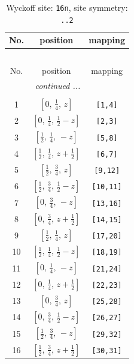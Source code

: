 \documentclass[fleqn,8pt]{jsarticle}
\begin{document}
\renewcommand{\arraystretch}{1.2}
\begin{longtable}{ccc}
\caption{Wyckoff site: {\tt 16n}, site symmetry: {\tt ..2}}
 \\
 \hline \hline
No. & position & mapping \\ \hline \endfirsthead

\multicolumn{2}{l}{\tablename\ \thetable{}} \\
 \hline \hline
No. & position & mapping \\ \hline \endhead

 \hline \hline
\multicolumn{2}{r}{\footnotesize\it continued ...} \\ \endfoot

 \hline \hline
\multicolumn{2}{r}{} \\ \endlastfoot

1 & $\left[ 0,\, \frac{1}{4},\, z \right]$ & {\tt [1,4]} \\ \hline
2 & $\left[ 0,\, \frac{1}{4},\, \frac{1}{2} - z \right]$ & {\tt [2,3]} \\ \hline
3 & $\left[ \frac{1}{2},\, \frac{1}{4},\, - z \right]$ & {\tt [5,8]} \\ \hline
4 & $\left[ \frac{1}{2},\, \frac{1}{4},\, z + \frac{1}{2} \right]$ & {\tt [6,7]} \\ \hline
5 & $\left[ \frac{1}{2},\, \frac{3}{4},\, z \right]$ & {\tt [9,12]} \\ \hline
6 & $\left[ \frac{1}{2},\, \frac{3}{4},\, \frac{1}{2} - z \right]$ & {\tt [10,11]} \\ \hline
7 & $\left[ 0,\, \frac{3}{4},\, - z \right]$ & {\tt [13,16]} \\ \hline
8 & $\left[ 0,\, \frac{3}{4},\, z + \frac{1}{2} \right]$ & {\tt [14,15]} \\ \hline
9 & $\left[ \frac{1}{2},\, \frac{1}{4},\, z \right]$ & {\tt [17,20]} \\ \hline
10 & $\left[ \frac{1}{2},\, \frac{1}{4},\, \frac{1}{2} - z \right]$ & {\tt [18,19]} \\ \hline
11 & $\left[ 0,\, \frac{1}{4},\, - z \right]$ & {\tt [21,24]} \\ \hline
12 & $\left[ 0,\, \frac{1}{4},\, z + \frac{1}{2} \right]$ & {\tt [22,23]} \\ \hline
13 & $\left[ 0,\, \frac{3}{4},\, z \right]$ & {\tt [25,28]} \\ \hline
14 & $\left[ 0,\, \frac{3}{4},\, \frac{1}{2} - z \right]$ & {\tt [26,27]} \\ \hline
15 & $\left[ \frac{1}{2},\, \frac{3}{4},\, - z \right]$ & {\tt [29,32]} \\ \hline
16 & $\left[ \frac{1}{2},\, \frac{3}{4},\, z + \frac{1}{2} \right]$ & {\tt [30,31]} \\
\end{longtable}
\end{document}
